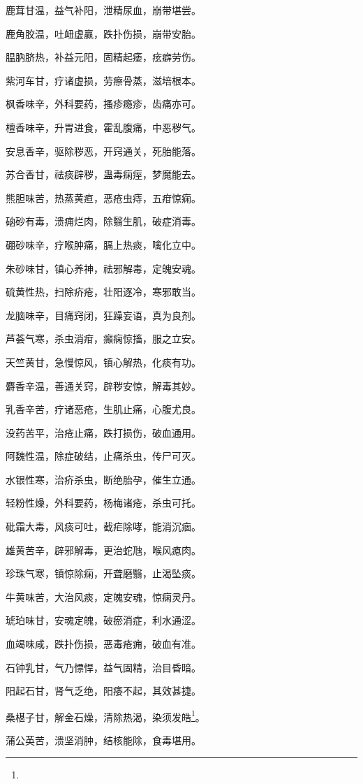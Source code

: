 \documentclass[a4paper,12pt,UTF8,twoside]{ctexbook}
\begin{document}
鹿茸甘温，益气补阳，泄精尿血，崩带堪尝。

鹿角胶温，吐衄虚贏，跌扑伤损，崩带安胎。

腽肭脐热，补益元阳，固精起痿，痃癖劳伤。

紫河车甘，疗诸虚损，劳瘵骨蒸，滋培根本。

枫香味辛，外科要药，搔疹瘾疹，齿痛亦可。

檀香味辛，升胃进食，霍乱腹痛，中恶秽气。

安息香辛，驱除秽恶，开窍通关，死胎能落。

苏合香甘，祛痰辟秽，蛊毒痫痓，梦魔能去。

熊胆味苦，热蒸黄疸，恶疮虫痔，五疳惊痫。

硇砂有毒，溃痈烂肉，除翳生肌，破症消毒。

硼砂味辛，疗喉肿痛，膈上热痰，噙化立中。

朱砂味甘，镇心养神，祛邪解毒，定魄安魂。

硫黄性热，扫除疥疮，壮阳逐冷，寒邪敢当。

龙脑味辛，目痛窍闭，狂躁妄语，真为良剂。

芦荟气寒，杀虫消疳，癲痫惊搐，服之立安。

天竺黄甘，急慢惊风，镇心解热，化痰有功。

麝香辛温，善通关窍，辟秽安惊，解毒其妙。

乳香辛苦，疗诸恶疮，生肌止痛，心腹尤良。

没药苦平，治疮止痛，跌打损伤，破血通用。

阿魏性温，除症破结，止痛杀虫，传尸可灭。

水银性寒，治疥杀虫，断绝胎孕，催生立通。

轻粉性燥，外科要药，杨梅诸疮，杀虫可托。

砒霜大毒，风痰可吐，截疟除哮，能消沉痼。

雄黄苦辛，辟邪解毒，更治蛇虺，喉风瘜肉。

珍珠气寒，镇惊除痫，开聋磨翳，止渴坠痰。

牛黄味苦，大治风痰，定魄安魂，惊痫灵丹。

琥珀味甘，安魂定魄，破瘀消症，利水通涩。

血竭味咸，跌扑伤损，恶毒疮痈，破血有准。

石钟乳甘，气乃慓悍，益气固精，治目昏暗。

阳起石甘，肾气乏绝，阳痿不起，其效甚捷。

桑椹子甘，解金石燥，清除热渴，染须发皓\footnote{}。

蒲公英苦，溃坚消肿，结核能除，食毒堪用。
\end{document}
